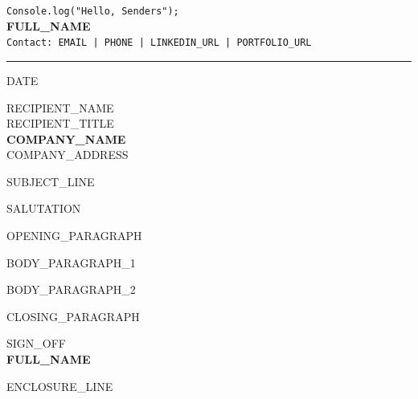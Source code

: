 \documentclass[a4paper,10pt]{article}
\begin{document}
{\texttt{Console.log("Hello, Senders");}}\\
\textbf{\Huge {{FULL_NAME}}}\\
\texttt{Contact: {{EMAIL}} | {{PHONE}} | {{LINKEDIN_URL}} | {{PORTFOLIO_URL}}}\\
\rule{\textwidth}{1pt}

\vspace{1em}
{{DATE}}

\vspace{1em}
{{RECIPIENT_NAME}} \\
{{RECIPIENT_TITLE}} \\
\textbf{{{COMPANY_NAME}}} \\
{{COMPANY_ADDRESS}}

\vspace{1em}
{{SUBJECT_LINE}}

\vspace{1em}
{{SALUTATION}}

{{OPENING_PARAGRAPH}}

{{BODY_PARAGRAPH_1}}

{{BODY_PARAGRAPH_2}}

{{CLOSING_PARAGRAPH}}

\vspace{1.5em}
{{SIGN_OFF}}\\[2em]
\textbf{{{FULL_NAME}}}

\vspace{2em}
{{ENCLOSURE_LINE}}
\end{document}

